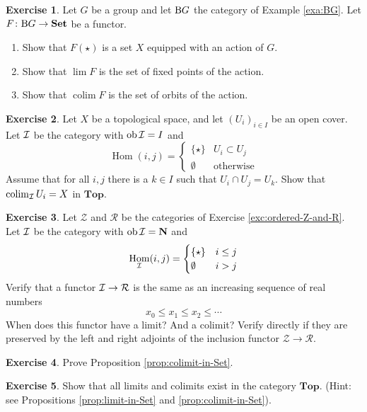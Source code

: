 \documentclass[11pt]{amsbook}
\DeclareMathOperator\Hom{Hom}
\DeclareMathOperator\ob{ob}
\DeclareMathOperator\colim{colim}
\def\bN{{\mathbf{N}}}
\def\cR{{\mathcal{R}}} \def\cZ{{\mathcal{Z}}}
\def\Set{\mathbf{Set}}
\def\Top{\mathbf{Top}}
\theoremstyle{plain}
\theoremstyle{definition}
\newtheorem{exercise}{Exercise}
\begin{document}
\begin{exercise}
Let $G$ be a group and let ${\mathrm B} G$ the category of Example \ref{exa:BG}. Let $F\colon \rB G \to \Set$ be a functor. 
\begin{enumerate}
\item Show that $F(\star)$ is a set $X$ equipped with an action of $G$.
\item Show that $\lim F$ is the set of fixed points of the action.
\item Show that $\colim F$ is the set of orbits of the action. 
\end{enumerate}
\end{exercise}

\begin{exercise}
Let $X$ be a topological space, and let $(U_i)_{i\in I}$ be an open cover. Let ${\mathcal{I}}$ be the category with $\ob \cI = I$ and
\[
	\Hom(i,j) = \begin{cases} \{\star\} & U_i \subset U_j \\ \emptyset & \text{otherwise} \end{cases}
\]
Assume that for all $i,j$ there is a $k\in I$ such that $U_i \cap U_j = U_k$. Show that $\colim_\cI U_i = X$ in $\Top$.
\end{exercise}

\begin{exercise}
Let $\cZ$ and $\cR$ be the categories of Exercise \ref{exc:ordered-Z-and-R}. Let ${\mathcal{I}}$ be the category with $\ob \cI = \bN$ and
\[
	\Hom_\cI(i,j) = \begin{cases} \{\star\} & i\leq j \\ \emptyset & i > j \end{cases}
\]
Verify that a functor $\cI \to \cR$ is the same as an increasing sequence of real numbers
\[
	x_0 \leq x_1 \leq x_2 \leq \cdots
\]
When does this functor have a limit? And a colimit? Verify directly if they are preserved by the left and right adjoints of the inclusion functor $\cZ \to \cR$.
\end{exercise}

\begin{exercise}\label{exc:colimit-in-Set}
Prove Proposition \ref{prop:colimit-in-Set}.
\end{exercise}

\begin{exercise}Show that all limits and colimits exist in the category $\Top$. 
(Hint: see Propositions \ref{prop:limit-in-Set} and \ref{prop:colimit-in-Set}).
\end{exercise}
\end{document}

